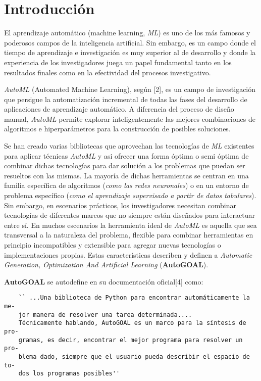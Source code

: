 \chapter*{Introducción}\label{chapter:introduction}

El aprendizaje automático (machine learning, {\it ML}) es uno de los más famosos
y poderosos campos de la inteligencia artificial. Sin embargo, es un campo
donde el tiempo de aprendizaje e investigación es muy superior al de desarrollo
y donde la experiencia de los investigadores juega un papel fundamental tanto
en los resultados finales como en la efectividad del procesos investigativo.

    {\it AutoML} (Automated Machine Learning), según [2], es un campo de investigación
que persigue la automatización incremental de todas las fases del desarrollo
de aplicaciones de aprendizaje automático. A diferencia del proceso de diseño
manual, {\it AutoML} permite explorar inteligentemente las mejores combinaciones
de algoritmos e hiperparámetros para la construcción de posibles soluciones.

Se han creado varias bibliotecas que aprovechan las tecnologías de {\it ML}
existentes para aplicar técnicas {\it AutoML} y asi ofrecer una forma óptima
o semi óptima de combinar dichas tecnologías para dar solución a
los problemas que puedan ser resueltos con las mismas. La mayoría de dichas
herramientas se centran en una familia específica de algoritmos ({\it como las
        redes neuronales}) o en un entorno de problema específico ({\it como el
        aprendizaje supervisado a partir de datos tabulares}). Sin embargo, en
escenarios prácticos, los investigadores necesitan combinar tecnologías de
diferentes marcos que no siempre están diseñados para interactuar entre sí.
En muchos escenarios la herramienta ideal de {\it AutoML} es aquella que sea
transversal a la naturaleza del problema, flexible para combinar herramientas
en principio incompatibles y extensible para agregar nuevas tecnologías o
implementaciones propias. Estas características describen y definen a
    {\it Automatic Generation, Optimization And Artificial Learning} ({\bf AutoGOAL}).

    {\bf AutoGOAL} se autodefine en su documentación oficial[4] como:

\begin{verbatim}
    `` ...Una biblioteca de Python para encontrar automáticamente la me-
    jor manera de resolver una tarea determinada.... 
    Técnicamente hablando, AutoGOAL es un marco para la síntesis de pro-
    gramas, es decir, encontrar el mejor programa para resolver un pro-
    blema dado, siempre que el usuario pueda describir el espacio de to-
    dos los programas posibles''
\end{verbatim}


